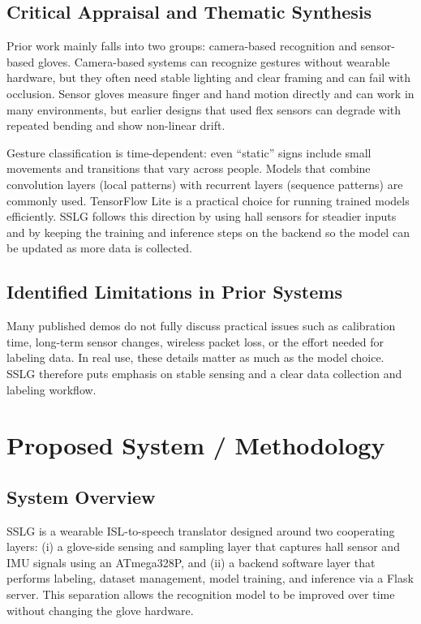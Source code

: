 \documentclass[conference]{IEEEtran}
\begin{document}
\subsection{Critical Appraisal and Thematic Synthesis}
Prior work mainly falls into two groups: camera-based recognition and sensor-based gloves. Camera-based systems can recognize gestures without wearable hardware, but they often need stable lighting and clear framing and can fail with occlusion\cite{mitra}. Sensor gloves measure finger and hand motion directly and can work in many environments, but earlier designs that used flex sensors can degrade with repeated bending and show non-linear drift.

Gesture classification is time-dependent: even ``static'' signs include small movements and transitions that vary across people. Models that combine convolution layers (local patterns) with recurrent layers (sequence patterns) are commonly used. TensorFlow Lite is a practical choice for running trained models efficiently\cite{tensorflow}. SSLG follows this direction by using hall sensors for steadier inputs and by keeping the training and inference steps on the backend so the model can be updated as more data is collected.

\subsection{Identified Limitations in Prior Systems}
Many published demos do not fully discuss practical issues such as calibration time, long-term sensor changes, wireless packet loss, or the effort needed for labeling data. In real use, these details matter as much as the model choice. SSLG therefore puts emphasis on stable sensing and a clear data collection and labeling workflow.

\section{Proposed System / Methodology}
\subsection{System Overview}
SSLG is a wearable ISL-to-speech translator designed around two cooperating layers: (i) a glove-side sensing and sampling layer that captures hall sensor and IMU signals using an ATmega328P, and (ii) a backend software layer that performs labeling, dataset management, model training, and inference via a Flask server. This separation allows the recognition model to be improved over time without changing the glove hardware.
\end{document}
